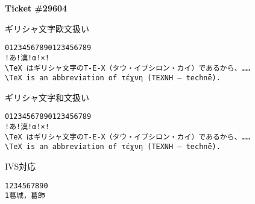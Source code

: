 \documentclass{article}
\begin{document}
\newpage
\textbf{Ticket \#29604}

\setmonofont{DejaVu Sans Mono}
ギリシャ文字欧文扱い

\begin{lstlisting}[basewidth=.5em,basicstyle=\tt, emph={TeX}, emphstyle=\color{red}]
01234567890123456789
!あ!漢!α!×!
\TeX はギリシャ文字のΤ-Ε-Χ（タウ・イプシロン・カイ）であるから、……
\TeX is an abbreviation of τέχνη (ΤΕΧΝΗ – technē).
\end{lstlisting}

ギリシャ文字和文扱い

\begin{lstlisting}[basewidth=.5em,basicstyle=\tt, emph={TeX}, emphstyle=\color{red}]
01234567890123456789
!あ!漢!α!×!
\TeX はギリシャ文字のΤ-Ε-Χ（タウ・イプシロン・カイ）であるから、……
\TeX is an abbreviation of τέχνη (ΤΕΧΝΗ – technē).
\end{lstlisting}

\newpage
IVS対応

\begin{lstlisting}[escapechar=\%,basicstyle=\tt]
1234567890
1葛󠄀城，葛󠄁飾
\end{lstlisting}
\end{document}
